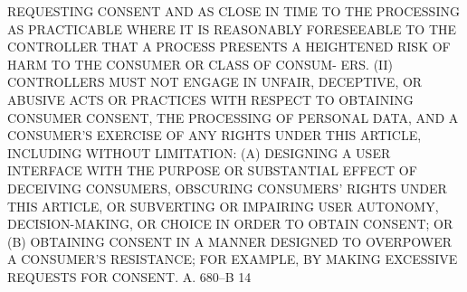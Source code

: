  REQUESTING CONSENT AND AS CLOSE IN TIME TO THE PROCESSING AS PRACTICABLE
 WHERE  IT  IS  REASONABLY  FORESEEABLE  TO THE CONTROLLER THAT A PROCESS
 PRESENTS A HEIGHTENED RISK OF HARM TO THE CONSUMER OR CLASS  OF  CONSUM-
 ERS.
   (II) CONTROLLERS MUST NOT ENGAGE IN UNFAIR, DECEPTIVE, OR ABUSIVE ACTS
 OR  PRACTICES WITH RESPECT TO OBTAINING CONSUMER CONSENT, THE PROCESSING
 OF PERSONAL DATA, AND A CONSUMER'S EXERCISE OF  ANY  RIGHTS  UNDER  THIS
 ARTICLE, INCLUDING WITHOUT LIMITATION:
   (A)  DESIGNING A USER INTERFACE WITH THE PURPOSE OR SUBSTANTIAL EFFECT
 OF DECEIVING CONSUMERS, OBSCURING CONSUMERS' RIGHTS UNDER THIS  ARTICLE,
 OR  SUBVERTING OR IMPAIRING USER AUTONOMY, DECISION-MAKING, OR CHOICE IN
 ORDER TO OBTAIN CONSENT; OR
   (B) OBTAINING CONSENT IN A MANNER DESIGNED TO OVERPOWER  A  CONSUMER'S
 RESISTANCE; FOR EXAMPLE, BY MAKING EXCESSIVE REQUESTS FOR CONSENT.
 A. 680--B                          14
 
